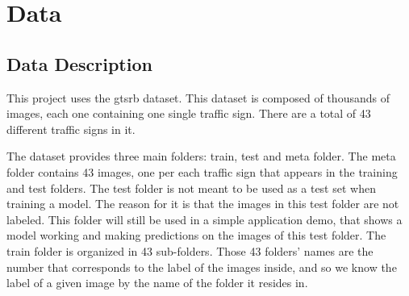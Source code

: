 \documentclass[12pt]{article}
\begin{document}
\tableofcontents

\clearpage
{}


\section{Data}
\label{section.data}

\subsection{Data Description}
\label{subsection.data_description}
    \par
        This project uses the \ac{gtsrb}\cite{kaggle_dataset} dataset. This dataset is composed of thousands of images, each one containing
        one single traffic sign. There are a total of 43 different traffic signs in it. 
    \par 
        The dataset provides three main folders: train, test and meta folder. The meta folder contains 43 images, one per each traffic sign 
        that appears in the training and test folders. The test folder is not meant to be used as a test set when training a model. The reason 
        for it is that the images in this test folder are not labeled. This folder will still be used in a simple application demo, that shows 
        a model working and making predictions on the images of this test folder. The train folder is organized in 43 sub-folders. Those 43 folders' 
        names are the number that corresponds to the label of the images inside, and so we know the label of a given image by the name of the folder it 
        resides in.
\end{document}
